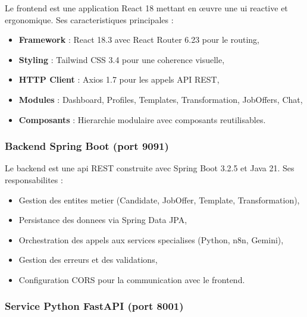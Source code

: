 Le frontend est une application React 18 mettant en œuvre une \acrfull{ui} reactive et ergonomique. Ses caracteristiques principales :

\begin{itemize}
    \item \textbf{Framework} : React 18.3 avec React Router 6.23 pour le routing,
    
    \item \textbf{Styling} : Tailwind CSS 3.4 pour une coherence visuelle,
    
    \item \textbf{HTTP Client} : Axios 1.7 pour les appels API REST,
    
    \item \textbf{Modules} : Dashboard, Profiles, Templates, Transformation, JobOffers, Chat,
    
    \item \textbf{Composants} : Hierarchie modulaire avec composants reutilisables.
\end{itemize}

\subsubsection{Backend Spring Boot (port 9091)}

Le backend est une \acrfull{api} REST construite avec Spring Boot 3.2.5 et Java 21. Ses responsabilites :

\begin{itemize}
    \item Gestion des entites metier (Candidate, JobOffer, Template, Transformation),
    
    \item Persistance des donnees via Spring Data JPA,
    
    \item Orchestration des appels aux services specialises (Python, n8n, Gemini),
    
    \item Gestion des erreurs et des validations,
    
    \item Configuration CORS pour la communication avec le frontend.
\end{itemize}

\subsubsection{Service Python FastAPI (port 8001)}

